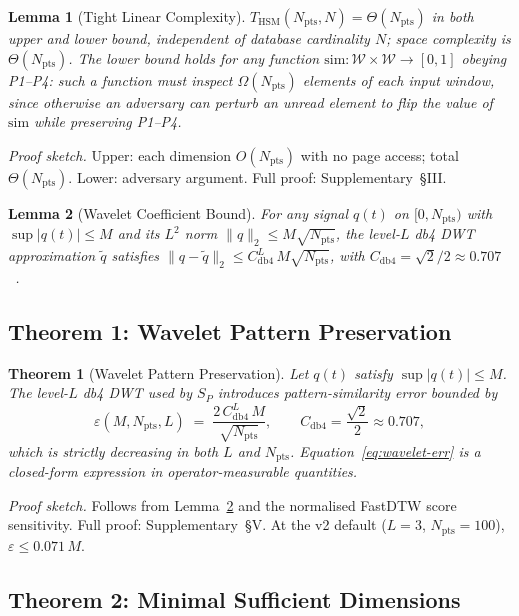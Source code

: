 \documentclass[10pt,journal,compsoc]{IEEEtran}
\newtheorem{theorem}{Theorem}
\newtheorem{lemma}{Lemma}
\newcommand{\SPER}{S_{P}}
\newcommand{\Npts}{N_{\mathrm{pts}}}
\begin{document}
\begin{lemma}[Tight Linear Complexity]\label{lem:complexity}
$T_{\mathrm{HSM}}(\Npts,N)\!=\!\Theta(\Npts)$ in both upper and lower
bound, independent of database cardinality $N$; space complexity is
$\Theta(\Npts)$. The lower bound holds for any function
$\mathrm{sim}:\mathcal{W}\times\mathcal{W}\!\to\![0,1]$ obeying P1--P4:
such a function must inspect $\Omega(\Npts)$ elements of each input
window, since otherwise an adversary can perturb an unread element to
flip the value of $\mathrm{sim}$ while preserving P1--P4.
\end{lemma}
\noindent\textit{Proof sketch.}
Upper: each dimension $O(\Npts)$ with no page access; total $\Theta(\Npts)$.
Lower: adversary argument. Full proof: Supplementary~\S III.

\begin{lemma}[Wavelet Coefficient Bound]\label{lem:wcb}
For any signal $q(t)$ on $[0,\Npts)$ with $\sup|q(t)|\leq M$ and
its $L^{2}$ norm $\|q\|_{2}\leq M\sqrt{\Npts}$, the level-$L$ db4
DWT approximation $\tilde{q}$ satisfies
$\|q-\tilde{q}\|_{2}\leq C_{\mathrm{db4}}^{L}\,M\sqrt{\Npts}$,
with $C_{\mathrm{db4}}\!=\!\sqrt{2}/2\approx 0.707$~\cite{Mallat1989Wavelets}.
\end{lemma}

\subsection{Theorem 1: Wavelet Pattern Preservation}

\begin{theorem}[Wavelet Pattern Preservation]\label{thm:wavelet}
Let $q(t)$ satisfy $\sup|q(t)|\leq M$. The level-$L$ db4 DWT used by
$\SPER$ introduces pattern-similarity error bounded by
\begin{equation}\label{eq:wavelet-err}
  \varepsilon(M,\Npts,L)\;=\;\frac{2\,C_{\mathrm{db4}}^{L}\,M}{\sqrt{\Npts}},
  \qquad C_{\mathrm{db4}}=\frac{\sqrt{2}}{2}\approx 0.707,
\end{equation}
which is strictly decreasing in both $L$ and $\Npts$. Equation~\eqref{eq:wavelet-err}
is a closed-form expression in operator-measurable quantities.
\end{theorem}
\noindent\textit{Proof sketch.}
Follows from Lemma~\ref{lem:wcb} and the normalised FastDTW score sensitivity.
Full proof: Supplementary~\S V.
At the v2 default ($L\!=\!3$, $\Npts\!=\!100$), $\varepsilon\!\leq\!0.071\,M$.

\subsection{Theorem 2: Minimal Sufficient Dimensions}
\end{document}
